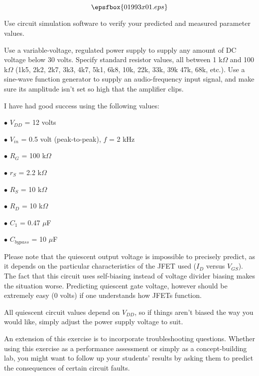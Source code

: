 

$$\epsfbox{01993x01.eps}$$

\vfil \eject






Use circuit simulation software to verify your predicted and measured parameter values.







Use a variable-voltage, regulated power supply to supply any amount of DC voltage below 30 volts.  Specify standard resistor values, all between 1 k$\Omega$ and 100 k$\Omega$ (1k5, 2k2, 2k7, 3k3, 4k7, 5k1, 6k8, 10k, 22k, 33k, 39k 47k, 68k, etc.).  Use a sine-wave function generator to supply an audio-frequency input signal, and make sure its amplitude isn't set so high that the amplifier clips.

I have had good success using the following values:

\medskip
\item{$\bullet$} $V_{DD}$ = 12 volts
\item{$\bullet$} $V_{in}$ = 0.5 volt (peak-to-peak), $f$ = 2 kHz
\item{$\bullet$} $R_G$ = 100 k$\Omega$
\item{$\bullet$} $r_S$ = 2.2 k$\Omega$
\item{$\bullet$} $R_S$ = 10 k$\Omega$
\item{$\bullet$} $R_D$ = 10 k$\Omega$
\item{$\bullet$} $C_1$ = 0.47 $\mu$F
\item{$\bullet$} $C_{bypass}$ = 10 $\mu$F
\medskip

Please note that the quiescent output voltage is impossible to precisely predict, as it depends on the particular characteristics of the JFET used ($I_D$ versus $V_{GS}$).  The fact that this circuit uses self-biasing instead of voltage divider biasing makes the situation worse.  Predicting quiescent gate voltage, however should be extremely easy (0 volts) if one understands how JFETs function.

All quiescent circuit values depend on $V_{DD}$, so if things aren't biased the way you would like, simply adjust the power supply voltage to suit.

An extension of this exercise is to incorporate troubleshooting questions.  Whether using this exercise as a performance assessment or simply as a concept-building lab, you might want to follow up your students' results by asking them to predict the consequences of certain circuit faults.




